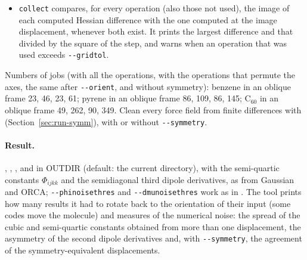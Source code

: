 \begin{itemize}
\begin{itemize}
  \end{itemize}
  \texttt{collect} rotates the results back, so the files are in the
  frame of the reference.  then recomputes the reference in
  the new frame, and the reference file cannot stand in for it. With
  \texttt{-{}-orient}, \texttt{auto} uses the operations that permute the
  axes in the new frame, unless \texttt{-{}-gridref} gives the
   of the oriented run. With a product grid even these may
  fail: for the pyrene template above inversion fails at the symmetric
  geometry, so test with \texttt{-{}-gridref}.
\item \texttt{collect} compares, for every operation (also those not
  used), the image of each computed Hessian difference with the one
  computed at the image displacement, whenever both exist. It prints the
  largest difference and that divided by the square of the step, and
  warns when an operation that was used exceeds \texttt{-{}-gridtol}.
\end{itemize}
Numbers of jobs (with all the operations, with the operations that
permute the axes, the same after \texttt{-{}-orient}, and without
symmetry): benzene in an oblique frame 23, 46, 23, 61; pyrene in an
oblique frame 86, 109, 86, 145; C$_{60}$ in an oblique frame 49, 262, 90,
349. Clean every force field from finite differences with
 (Section~\ref{sec:run-symm}), with or without
\texttt{-{}-symmetry}.

\paragraph{Result.} , , ,
 and  in OUTDIR (default: the current
directory), with the semi-quartic constants $\Phi_{ijkk}$ and the
semidiagonal third dipole derivatives, as from Gaussian and ORCA;
\texttt{-{}-phinoisethres} and \texttt{-{}-dmunoisethres} work as in
. The tool prints how many results it had to rotate
back to the orientation of their input (some codes move the molecule)
and measures of the numerical noise: the spread of the cubic and
semi-quartic constants obtained from more than one displacement, the
asymmetry of the second dipole derivatives and, with
\texttt{-{}-symmetry}, the agreement of the symmetry-equivalent
displacements.

